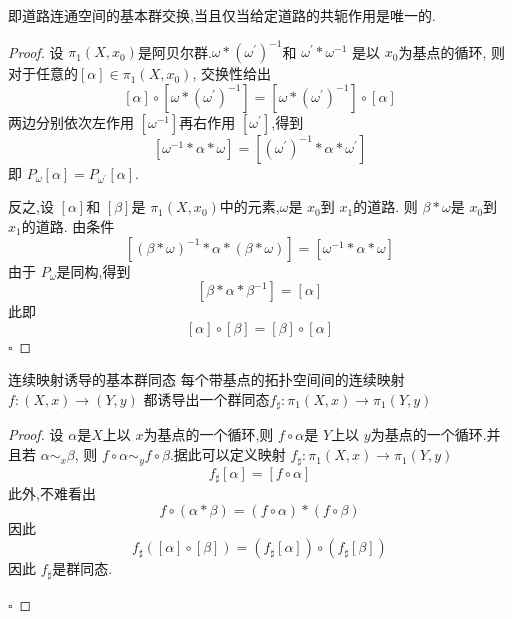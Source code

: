 \documentclass[../../几何与拓扑.tex]{subfiles}
\begin{document}
\begin{note}

    即道路连通空间的基本群交换,当且仅当给定道路的共轭作用是唯一的.

\end{note}
\begin{proof}

    设 \(  \pi _1 \left( X,x_0 \right)   \)是阿贝尔群.\(   \omega * \left(  \omega ^{\prime}  \right)^{-1}    \)和 \(  \omega ^{\prime} * \omega ^{-1}   \) 是以 \(  x_0  \)为基点的循环,  则对于任意的\(  [\alpha ] \in \pi _1 \left( X,x_0 \right)   \),
    交换性给出 \[
    [\alpha ]\circ [ \omega *\left(  \omega ^{\prime}  \right)^{-1}  ] =  [ \omega *\left(  \omega ^{\prime}  \right)^{-1}  ]\circ [\alpha ]
    \]两边分别依次左作用 \(  [ \omega ^{-1} ]  \)再右作用 \(  [ \omega ^{\prime} ]  \),得到 \[
    [ \omega ^{-1} *\alpha * \omega ] = [\left(  \omega ^{\prime}  \right)^{-1}  *\alpha *  \omega ^{\prime} ]
    \]  即 \(  P_{ \omega }[\alpha ]= P_{ \omega ^{\prime} }[\alpha ]  \).
    
    反之,设 \(  [\alpha ]  \)和 \(  [\beta ]  \)是 \(  \pi _1 \left( X,x_0 \right)   \)中的元素,\(   \omega   \)是 \(  x_0  \)到 \(  x_1  \)的道路. 则 \(  \beta * \omega   \)是 \(  x_0  \)到 \(  x_1  \)的道路.
    由条件 \[
    [\left( \beta * \omega  \right)^{-1} *\alpha *\left( \beta * \omega  \right)  ]= [ \omega ^{-1} *\alpha * \omega ]
    \]    由于 \(  P_{ \omega }  \)是同构,得到 \[
    [\beta *\alpha *\beta ^{-1} ]= [\alpha ]
    \] 此即 \[
    [\alpha ]\circ [\beta ] =  [\beta ]\circ [\alpha ]
    \]
    \hfill $\square$
\end{proof}


\begin{theorem}{连续映射诱导的基本群同态}
    每个带基点的拓扑空间间的连续映射 \(  f:\left( X,x \right)\to \left( Y,y \right)    \) 
    都诱导出一个群同态\(  f_{\sharp}:\pi _1 \left( X,x \right)\to \pi _1 \left( Y,y \right)    \) 
\end{theorem}


\begin{proof}

    设 \(  \alpha   \)是\(  X  \)上以 \(  x  \)为基点的一个循环,则 \(  f\circ \alpha   \)是 \(  Y  \)上以 \(  y  \)为基点的一个循环.并且若 \(  \alpha \sim _{x}\beta   \),
    则 \(  f\circ \alpha \sim _{y} f\circ \beta   \).据此可以定义映射 \(  f_{\sharp }: \pi _1 \left( X,x \right)\to \pi _1 \left( Y,y \right)    \)\[
     f_{\sharp }[\alpha ] =  [f\circ \alpha ]
    \]        此外,不难看出 \[
    f\circ \left( \alpha *\beta  \right) =  \left( f\circ \alpha  \right)*\left( f\circ \beta  \right)   
    \]因此 \[
    f_{\sharp }\left( [\alpha ]\circ [\beta ] \right) =  \left( f_{\sharp }[\alpha ] \right)\circ \left( f_{\sharp }[\beta ] \right)   
    \]因此 \(  f_{\sharp }  \)是群同态. 

    \hfill $\square$
\end{proof}
\end{document}

